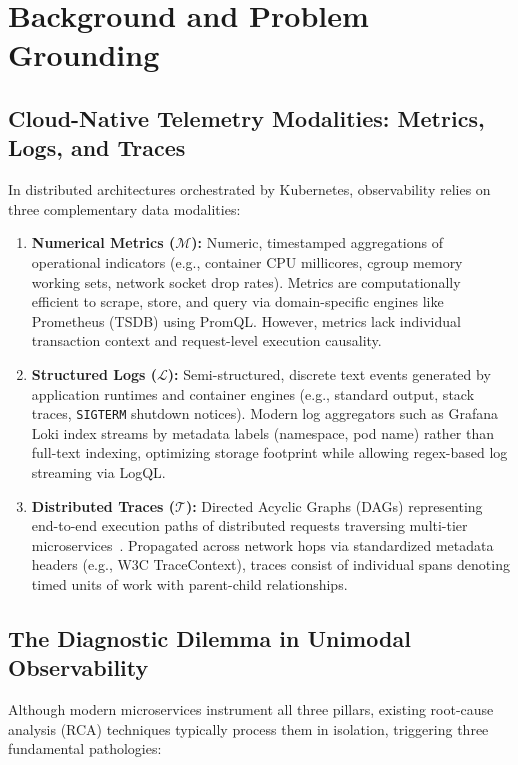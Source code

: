 \section{Background and Problem Grounding}
\label{sec:background}

\subsection{Cloud-Native Telemetry Modalities: Metrics, Logs, and Traces}
In distributed architectures orchestrated by Kubernetes, observability relies on three complementary data modalities:
\begin{enumerate}[leftmargin=1.2em, itemsep=2pt, topsep=3pt]
    \item \textbf{Numerical Metrics ($\mathcal{M}$):} Numeric, timestamped aggregations of operational indicators (e.g., container CPU millicores, cgroup memory working sets, network socket drop rates). Metrics are computationally efficient to scrape, store, and query via domain-specific engines like Prometheus (TSDB) using PromQL. However, metrics lack individual transaction context and request-level execution causality.
    \item \textbf{Structured Logs ($\mathcal{L}$):} Semi-structured, discrete text events generated by application runtimes and container engines (e.g., standard output, stack traces, \texttt{SIGTERM} shutdown notices). Modern log aggregators such as Grafana Loki index streams by metadata labels (namespace, pod name) rather than full-text indexing, optimizing storage footprint while allowing regex-based log streaming via LogQL.
    \item \textbf{Distributed Traces ($\mathcal{T}$):} Directed Acyclic Graphs (DAGs) representing end-to-end execution paths of distributed requests traversing multi-tier microservices~\cite{sigelman_2010}. Propagated across network hops via standardized metadata headers (e.g., W3C TraceContext), traces consist of individual spans denoting timed units of work with parent-child relationships.
\end{enumerate}

\subsection{The Diagnostic Dilemma in Unimodal Observability}
Although modern microservices instrument all three pillars, existing root-cause analysis (RCA) techniques typically process them in isolation, triggering three fundamental pathologies:

